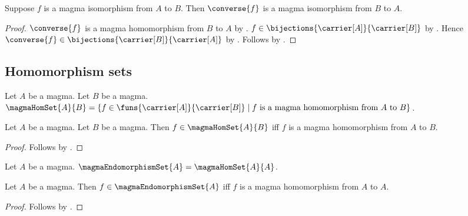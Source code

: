 \begin{theorem}\label{magma_isomorphism_converse}
    Suppose $f$ is a magma isomorphism from $A$ to $B$.
    Then $\converse{f}$ is a magma isomorphism from $B$ to $A$.
\end{theorem}
\begin{proof}
    $\converse{f}$ is a magma homomorphism from $B$ to $A$ by
        .
    $f\in\bijections{\carrier[A]}{\carrier[B]}$ by
        .
    Hence $\converse{f}\in\bijections{\carrier[B]}{\carrier[A]}$ by
        .
    Follows by .
\end{proof}

\subsection{Homomorphism sets}

\begin{definition}\label{magma_hom_set}
    Let $A$ be a magma.
    Let $B$ be a magma.
    $\magmaHomSet{A}{B}=
        \{f\in\funs{\carrier[A]}{\carrier[B]}\mid
            \text{$f$ is a magma homomorphism from $A$ to $B$}\}$.
\end{definition}

\begin{proposition}\label{magma_hom_set_iff}
    Let $A$ be a magma.
    Let $B$ be a magma.
    Then $f\in\magmaHomSet{A}{B}$ iff
        $f$ is a magma homomorphism from $A$ to $B$.
\end{proposition}
\begin{proof}
    Follows by .
\end{proof}

\begin{definition}\label{magma_endomorphism_set}
    Let $A$ be a magma.
    $\magmaEndomorphismSet{A}=\magmaHomSet{A}{A}$.
\end{definition}

\begin{proposition}\label{magma_endomorphism_set_iff}
    Let $A$ be a magma.
    Then $f\in\magmaEndomorphismSet{A}$ iff
        $f$ is a magma homomorphism from $A$ to $A$.
\end{proposition}
\begin{proof}
    Follows by
        .
\end{proof}
